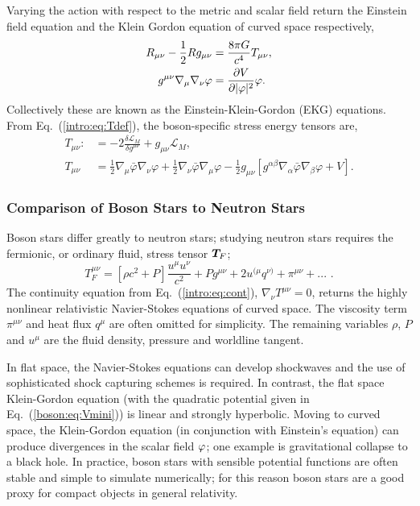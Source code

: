 Varying the action with respect to the metric and scalar field return the Einstein field equation and the Klein Gordon equation of curved space respectively,
\begin{align} R_{\mu\nu} - \frac{1}{2}R g_{\mu\nu} &=  \frac{8\pi G}{c^4} T_{\mu\nu}  ,\\
g^{\mu\nu}\nabla_\mu\nabla_\nu \varphi &= \frac{\partial V}{\partial |\varphi|^2}\varphi .\label{boson:eq:KGeqn}\end{align}
Collectively these are known as the Einstein-Klein-Gordon (EKG) equations. From Eq.~(\ref{intro:eq:Tdef}), the boson-specific stress energy tensors are,
\begin{align}
T_{\mu\nu} :&= -2\frac{\delta \mathcal{L}_{M}}{\delta g^{\mu\nu}}+g_{\mu\nu}\mathcal{L}_M, \\
T_{\mu\nu} &= \frac{1}{2}\nabla_{\mu}\bar{\varphi}\nabla_{\nu}\varphi+\frac{1}{2}\nabla_{\nu}\bar{\varphi}\nabla_{\mu}\varphi-\frac{1}{2}g_{\mu\nu}\left[g^{\alpha\beta}\nabla_\alpha\bar{\varphi}\nabla_\beta\varphi + V\right] \label{boson:eq:KGT}.
\end{align}


\subsubsection{Comparison of Boson Stars to Neutron Stars}
Boson stars differ greatly to neutron stars; studying neutron stars requires the
fermionic, or ordinary fluid, stress tensor $\boldsymbol{T}_F$;
\begin{equation} T^{\mu\nu}_F = \left[\rho c^2+ {P} \right]\frac{u^\mu u^\nu}{c^2}
+ P g^{\mu\nu} + 2u^{(\mu}q^{\nu)}+\pi^{\mu\nu}+ ...\,\,.\end{equation}
The continuity equation from Eq.~(\ref{intro:eq:cont}), $\nabla_\nu T^{\mu\nu}=0 $,
returns the highly nonlinear relativistic Navier-Stokes equations of curved space.
The viscosity term $\pi^{\mu\nu}$ and heat flux $q^\mu$ are often omitted for simplicity.
The remaining variables $\rho$, $P$ and $u^\mu$ are the fluid density, pressure and
worldline tangent.

In flat space, the Navier-Stokes equations can develop
shockwaves and the use of sophisticated shock capturing schemes is required. In
contrast, the flat space Klein-Gordon equation (with the quadratic potential given
in Eq.~(\ref{boson:eq:Vmini})) is linear and strongly hyperbolic. Moving to curved space,
the Klein-Gordon equation (in conjunction with Einstein's equation) can produce
divergences in the scalar field $\varphi$; one example is gravitational collapse to a
black hole. In practice, boson stars with sensible potential functions are
often stable and simple to simulate numerically; for this reason boson stars
are a good proxy for compact objects in general relativity.


